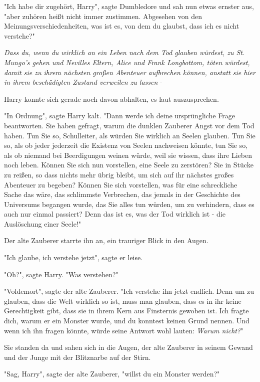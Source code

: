 {"Ich habe dir zugehört, Harry", sagte Dumbledore und sah nun etwas ernster aus, "aber zuhören heißt nicht immer zustimmen. Abgesehen von den Meinungsverschiedenheiten, was ist es, von dem du glaubst, dass ich es nicht verstehe?"

\emph{Dass du, wenn du wirklich an ein Leben nach dem Tod glauben würdest, zu St. Mungo's gehen und Nevilles Eltern, Alice und Frank Longbottom, töten würdest, damit sie zu ihrem nächsten großen Abenteuer aufbrechen können, anstatt sie hier in ihrem beschädigten Zustand verweilen zu lassen} -

Harry konnte sich gerade noch davon abhalten, es laut auszusprechen.

"In Ordnung", sagte Harry kalt. "Dann werde ich deine ursprüngliche Frage beantworten. Sie haben gefragt, warum die dunklen Zauberer Angst vor dem Tod haben. Tun Sie so, Schulleiter, als würden Sie wirklich an Seelen glauben. Tun Sie so, als ob jeder jederzeit die Existenz von Seelen nachweisen könnte, tun Sie so, als ob niemand bei Beerdigungen weinen würde, weil sie wissen, dass ihre Lieben noch leben. Können Sie sich nun vorstellen, eine Seele zu zerstören? Sie in Stücke zu reißen, so dass nichts mehr übrig bleibt, um sich auf ihr nächstes großes Abenteuer zu begeben? Können Sie sich vorstellen, was für eine schreckliche Sache das wäre, das schlimmste Verbrechen, das jemals in der Geschichte des Universums begangen wurde, das Sie alles tun würden, um zu verhindern, dass es auch nur einmal passiert? Denn das ist es, was der Tod wirklich ist - die Auslöschung einer Seele!"

Der alte Zauberer starrte ihn an, ein trauriger Blick in den Augen.

"Ich glaube, ich verstehe jetzt", sagte er leise.

"Oh?", sagte Harry. "Was verstehen?"

"Voldemort", sagte der alte Zauberer. "Ich verstehe ihn jetzt endlich. Denn um zu glauben, dass die Welt wirklich so ist, muss man glauben, dass es in ihr keine Gerechtigkeit gibt, dass sie in ihrem Kern aus Finsternis gewoben ist. Ich fragte dich, warum er ein Monster wurde, und du konntest keinen Grund nennen. Und wenn ich ihn fragen könnte, würde seine Antwort wohl lauten: \emph{Warum nicht?}"

Sie standen da und sahen sich in die Augen, der alte Zauberer in seinem Gewand und der Junge mit der Blitznarbe auf der Stirn.

"Sag, Harry", sagte der alte Zauberer, "willst du ein Monster werden?"

}
